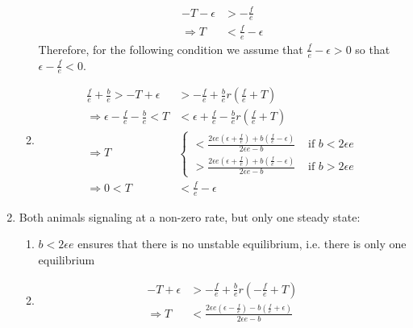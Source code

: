 \documentclass{article}
\begin{document}
\begin{enumerate}
\begin{enumerate}
\begin{align*}
-T-\epsilon&>-\frac{f}{e}
\\ \Rightarrow T&<\frac{f}{e}-\epsilon
\end{align*}
Therefore, for the following condition we assume that $\frac{f}{e}-\epsilon>0$ so that $\epsilon-\frac{f}{e}<0$.
\item 
\begin{align*}
\frac{f}{e}+\frac{b}{e}>-T+\epsilon&>-\frac{f}{e}+\frac{b}{e}r\left(\frac{f}{e}+T\right)
\\ \Rightarrow \epsilon-\frac{f}{e}-\frac{b}{e}<T&<\epsilon+\frac{f}{e}-\frac{b}{e}r\left(\frac{f}{e}+T\right)
\\ \Rightarrow T&\left\{\begin{array}{cccc}
<\frac{2\epsilon e(\epsilon +\frac{f}{e})+b(\frac{f}{e}-\epsilon)}{2\epsilon e-b} & \text{ if } b<2\epsilon e
\\ >\frac{2\epsilon e(\epsilon +\frac{f}{e})+b(\frac{f}{e}-\epsilon)}{2\epsilon e-b} & \text{ if } b>2\epsilon e
\end{array}\right.
\\ \Rightarrow
0<T&<\frac{f}{e}-\epsilon
\end{align*}
\end{enumerate}
\item Both animals signaling at a non-zero rate, but only one steady state:
\begin{enumerate}
\item $b<2\epsilon e$ ensures that there is no unstable equilibrium, i.e. there is only one equilibrium
\item 
\begin{align*}
-T+\epsilon&>-\frac{f}{e}+\frac{b}{e}r(-\frac{f}{e}+T)
\\ \Rightarrow T&<\frac{2\epsilon e(\epsilon -\frac{f}{e})-b(\frac{f}{e}+\epsilon)}{2\epsilon e-b} 
\end{align*}

\end{enumerate}



\end{enumerate}
\end{document}
